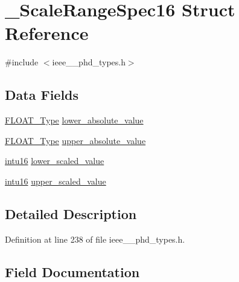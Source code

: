 \hypertarget{struct___scale_range_spec16}{}\section{\+\_\+\+Scale\+Range\+Spec16 Struct Reference}
\label{struct___scale_range_spec16}


{\ttfamily \#include $<$ieee\+\_\+\_\+phd\+\_\+types.\+h$>$}

\subsection*{Data Fields}
\begin{DoxyCompactItemize}
\item 
\hyperlink{ieee__11073__phd__types_8h_af070130e724f8e6babaa500f89591392}{F\+L\+O\+A\+T\+\_\+\+Type} \hyperlink{struct___scale_range_spec16_a76e8282bddb1102f4d0eba8c6495c0dd}{lower\+\_\+absolute\+\_\+value}
\item 
\hyperlink{ieee__11073__phd__types_8h_af070130e724f8e6babaa500f89591392}{F\+L\+O\+A\+T\+\_\+\+Type} \hyperlink{struct___scale_range_spec16_a277c28db15b66bc84d310a9d82c73ad1}{upper\+\_\+absolute\+\_\+value}
\item 
\hyperlink{ieee__11073__phd__types_8h_a3561595d2aa7416532e1c9910abd076d}{intu16} \hyperlink{struct___scale_range_spec16_a06c222cbdd408868260f7585a924b3db}{lower\+\_\+scaled\+\_\+value}
\item 
\hyperlink{ieee__11073__phd__types_8h_a3561595d2aa7416532e1c9910abd076d}{intu16} \hyperlink{struct___scale_range_spec16_a7709e50ab4d4cd02e9ef3e305a7f75f3}{upper\+\_\+scaled\+\_\+value}
\end{DoxyCompactItemize}


\subsection{Detailed Description}


Definition at line 238 of file ieee\+\_\+\_\+phd\+\_\+types.\+h.



\subsection{Field Documentation}
\hypertarget{struct___scale_range_spec16_a76e8282bddb1102f4d0eba8c6495c0dd}{}
